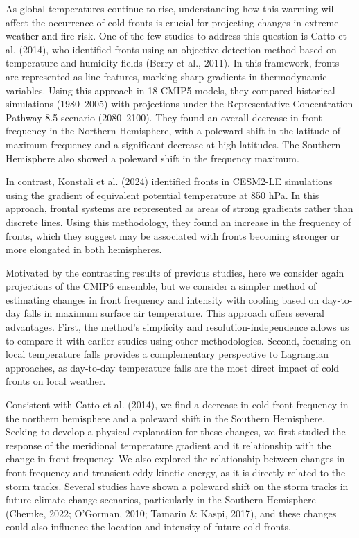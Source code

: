 \documentclass[
]{agujournal2019}
\begin{document}
As global temperatures continue to rise, understanding how this warming
will affect the occurrence of cold fronts is crucial for projecting
changes in extreme weather and fire risk. One of the few studies to
address this question is Catto et al. (2014), who identified fronts
using an objective detection method based on temperature and humidity
fields (Berry et al., 2011). In this framework, fronts are represented
as line features, marking sharp gradients in thermodynamic variables.
Using this approach in 18 CMIP5 models, they compared historical
simulations (1980--2005) with projections under the Representative
Concentration Pathway 8.5 scenario (2080--2100). They found an overall
decrease in front frequency in the Northern Hemisphere, with a poleward
shift in the latitude of maximum frequency and a significant decrease at
high latitudes. The Southern Hemisphere also showed a poleward shift in
the frequency maximum.

In contrast, Konstali et al. (2024) identified fronts in CESM2-LE
simulations using the gradient of equivalent potential temperature at
850 hPa. In this approach, frontal systems are represented as areas of
strong gradients rather than discrete lines. Using this methodology,
they found an increase in the frequency of fronts, which they suggest
may be associated with fronts becoming stronger or more elongated in
both hemispheres.

Motivated by the contrasting results of previous studies, here we
consider again projections of the CMIP6 ensemble, but we consider a
simpler method of estimating changes in front frequency and intensity
with cooling based on day-to-day falls in maximum surface air
temperature. This approach offers several advantages. First, the
method's simplicity and resolution-independence allows us to compare it
with earlier studies using other methodologies. Second, focusing on
local temperature falls provides a complementary perspective to
Lagrangian approaches, as day-to-day temperature falls are the most
direct impact of cold fronts on local weather.

Consistent with Catto et al. (2014), we find a decrease in cold front
frequency in the northern hemisphere and a poleward shift in the
Southern Hemisphere. Seeking to develop a physical explanation for these
changes, we first studied the response of the meridional temperature
gradient and it relationship with the change in front frequency. We also
explored the relationship between changes in front frequency and
transient eddy kinetic energy, as it is directly related to the storm
tracks. Several studies have shown a poleward shift on the storm tracks
in future climate change scenarios, particularly in the Southern
Hemisphere (Chemke, 2022; O'Gorman, 2010; Tamarin \& Kaspi, 2017), and
these changes could also influence the location and intensity of future
cold fronts.
\end{document}
